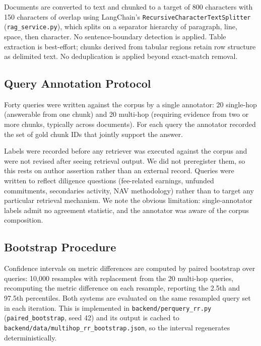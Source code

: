 \documentclass[runningheads]{llncs}
\begin{document}
Documents are converted to text and chunked to a target of 800 characters with 150 characters of overlap using LangChain's \texttt{RecursiveCharacterTextSplitter} (\texttt{rag\_service.py}), which splits on a separator hierarchy of paragraph, line, space, then character. No sentence-boundary detection is applied. Table extraction is best-effort; chunks derived from tabular regions retain row structure as delimited text. No deduplication is applied beyond exact-match removal.

\subsection{Query Annotation Protocol}

Forty queries were written against the corpus by a single annotator: 20 single-hop (answerable from one chunk) and 20 multi-hop (requiring evidence from two or more chunks, typically across documents). For each query the annotator recorded the set of gold chunk IDs that jointly support the answer.

Labels were recorded before any retriever was executed against the corpus and were not revised after seeing retrieval output. We did not preregister them, so this rests on author assertion rather than an external record. Queries were written to reflect diligence questions (fee-related earnings, unfunded commitments, secondaries activity, NAV methodology) rather than to target any particular retrieval mechanism. We note the obvious limitation: single-annotator labels admit no agreement statistic, and the annotator was aware of the corpus composition.

\subsection{Bootstrap Procedure}

Confidence intervals on metric differences are computed by paired bootstrap over queries: 10{,}000 resamples with replacement from the 20 multi-hop queries, recomputing the metric difference on each resample, reporting the 2.5th and 97.5th percentiles. Both systems are evaluated on the same resampled query set in each iteration. This is implemented in \texttt{backend/perquery\_rr.py} (\texttt{paired\_bootstrap}, seed 42) and its output is cached to \texttt{backend/data/multihop\_rr\_bootstrap.json}, so the interval regenerates deterministically.
\end{document}
